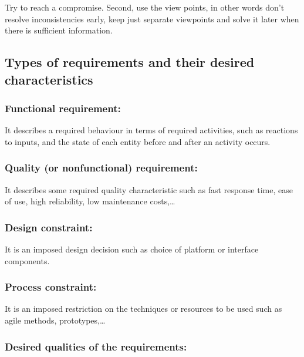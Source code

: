 Try to reach a compromise. Second, use the view points, in other words
don’t resolve inconsistencies early, keep just separate viewpoints and solve it later when
there is sufficient information.

\subsection{Types of requirements and their desired characteristics}

\subsubsection{Functional requirement:}
It describes a required behaviour in terms of required activities, such as reactions to inputs,
and the state of each entity before and after an activity occurs.

\subsubsection{Quality (or nonfunctional) requirement:}
It describes some required quality characteristic such as fast response time, ease of use,
high reliability, low maintenance costs,\ldots

\subsubsection{Design constraint:}
It is an imposed design decision such as choice of platform or interface components.

\subsubsection{Process constraint:}
It is an imposed restriction on the techniques or resources to be used such as agile methods,
prototypes,\ldots

\subsubsection{Desired qualities of the requirements:}

